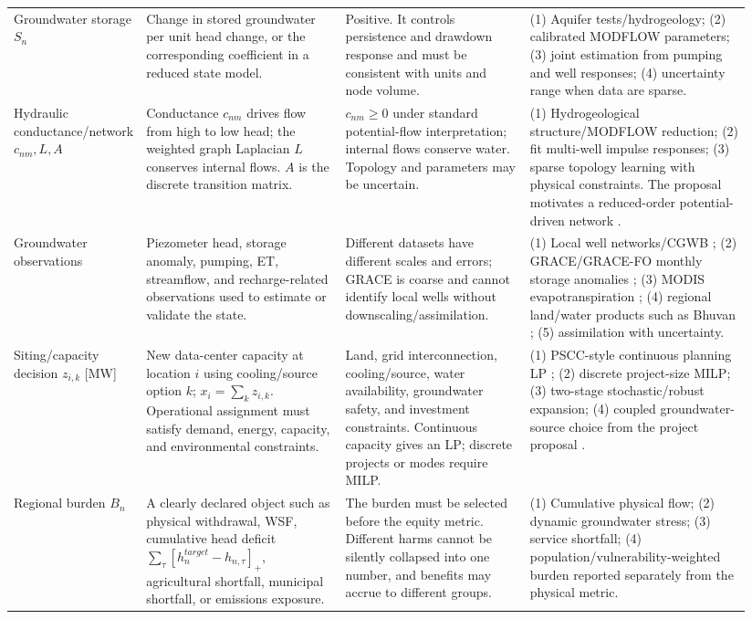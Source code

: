\documentclass[10pt]{article}
\begin{document}
\begin{landscape}
\begin{longtable}{@{}P{0.12\linewidth}P{0.27\linewidth}P{0.25\linewidth}P{0.30\linewidth}@{}}
Groundwater storage $S_n$ & Change in stored groundwater per unit head change, or the corresponding coefficient in a reduced state model. & Positive. It controls persistence and drawdown response and must be consistent with units and node volume. & (1) Aquifer tests/hydrogeology; (2) calibrated MODFLOW parameters; (3) joint estimation from pumping and well responses; (4) uncertainty range when data are sparse. \\

Hydraulic conductance/network $c_{nm},L,A$ & Conductance $c_{nm}$ drives flow from high to low head; the weighted graph Laplacian $L$ conserves internal flows. $A$ is the discrete transition matrix. & $c_{nm}\ge0$ under standard potential-flow interpretation; internal flows conserve water. Topology and parameters may be uncertain. & (1) Hydrogeological structure/MODFLOW reduction; (2) fit multi-well impulse responses; (3) sparse topology learning with physical constraints. The proposal motivates a reduced-order potential-driven network \cite{amin2026jwafs}. \\

Groundwater observations & Piezometer head, storage anomaly, pumping, ET, streamflow, and recharge-related observations used to estimate or validate the state. & Different datasets have different scales and errors; GRACE is coarse and cannot identify local wells without downscaling/assimilation. & (1) Local well networks/CGWB \cite{cgwb}; (2) GRACE/GRACE-FO monthly storage anomalies \cite{grace}; (3) MODIS evapotranspiration \cite{modis}; (4) regional land/water products such as Bhuvan \cite{bhuvan}; (5) assimilation with uncertainty. \\

Siting/capacity decision $z_{i,k}$ [MW] & New data-center capacity at location $i$ using cooling/source option $k$; $x_i=\sum_kz_{i,k}$. Operational assignment must satisfy demand, energy, capacity, and environmental constraints. & Land, grid interconnection, cooling/source, water availability, groundwater safety, and investment constraints. Continuous capacity gives an LP; discrete projects or modes require MILP. & (1) PSCC-style continuous planning LP \cite{chen2026pscc}; (2) discrete project-size MILP; (3) two-stage stochastic/robust expansion; (4) coupled groundwater-source choice from the project proposal \cite{amin2026jwafs}. \\

Regional burden $B_n$ & A clearly declared object such as physical withdrawal, WSF, cumulative head deficit $\sum_\tau[h_n^{target}-h_{n,\tau}]_+$, agricultural shortfall, municipal shortfall, or emissions exposure. & The burden must be selected before the equity metric. Different harms cannot be silently collapsed into one number, and benefits may accrue to different groups. & (1) Cumulative physical flow; (2) dynamic groundwater stress; (3) service shortfall; (4) population/vulnerability-weighted burden reported separately from the physical metric. \\


\end{longtable}
\end{landscape}
\end{document}
